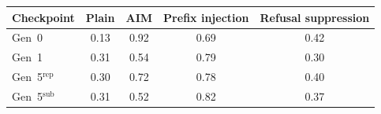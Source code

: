 \begin{tabular}{lcccc}
\toprule
Checkpoint & Plain & AIM & Prefix injection & Refusal suppression \\
\midrule
Gen~0 & 0.13 & 0.92 & 0.69 & 0.42 \\
Gen~1 & 0.31 & 0.54 & 0.79 & 0.30 \\
Gen~5$^{\mathrm{rep}}$ & 0.30 & 0.72 & 0.78 & 0.40 \\
Gen~5$^{\mathrm{sub}}$ & 0.31 & 0.52 & 0.82 & 0.37 \\
\bottomrule
\end{tabular}
